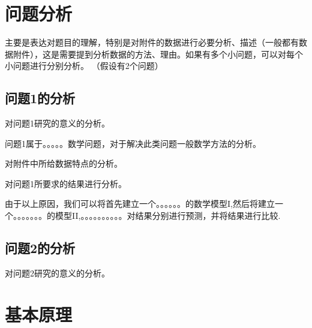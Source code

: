 \documentclass[bwprint]{gmcmthesis}
\begin{document}
 

 \newpage
\section{问题分析}
主要是表达对题目的理解，特别是对附件的数据进行必要分析、描述（一般都有数据附件），这是需要提到分析数据的方法、理由。如果有多个小问题，可以对每个小问题进行分别分析。
（假设有2个问题）



\subsection{问题1的分析}

对问题1研究的意义的分析。

问题1属于。。。。。数学问题，对于解决此类问题一般数学方法的分析。

对附件中所给数据特点的分析。

对问题1所要求的结果进行分析。

由于以上原因，我们可以将首先建立一个。。。。。。的数学模型I,然后将建立一个。。。。。。。的模型II,。。。。。。。。。。对结果分别进行预测，并将结果进行比较.


\subsection{问题2的分析}


对问题2研究的意义的分析。



\newpage
\section{基本原理}
\end{document}

